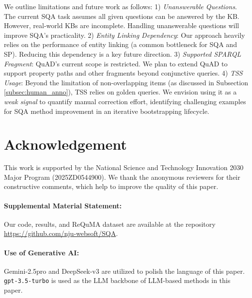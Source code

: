 \documentclass[runningheads]{llncs}
\begin{document}
We outline limitations and future work as follows:
1) \textit{Unanswerable Questions}. The current SQA task assumes all given questions can be answered by the KB. However, real-world KBs are incomplete. Handling unanswerable questions will improve SQA's practicality. 
2) \textit{Entity Linking Dependency}: Our approach heavily relies on the performance of entity linking (a common bottleneck for SQA and SP). Reducing this dependency is a key future direction.
3) \textit{Supported SPARQL Fragment}: QuAD's current scope is restricted. We plan to extend QuAD to support property paths and other fragments beyond conjunctive queries.
4) \textit{TSS Usage}: Beyond the limitation of non-overlapping items (as discussed in Subsection \ref{subsec:human_anno}), TSS relies on golden queries. We envision using it as a \textit{weak signal} to quantify manual correction effort, identifying challenging examples for SQA method improvement in an iterative bootstrapping lifecycle.


\section*{Acknowledgement}
This work is supported by the National Science and Technology Innovation 2030 Major Program (2025ZD0544900). We thank the anonymous reviewers for their constructive comments, which help
to improve the quality of this paper.

\paragraph*{Supplemental Material Statement:} 
Our code, results, and ReQuMA dataset are available at the repository \url{https://github.com/nju-websoft/SQA}.

\paragraph*{Use of Generative AI:} 
Gemini-2.5pro and DeepSeek-v3 are utilized to polish the language of this paper. \texttt{gpt-3.5-turbo} is used as the LLM backbone of LLM-based methods in this paper.



\end{document}
